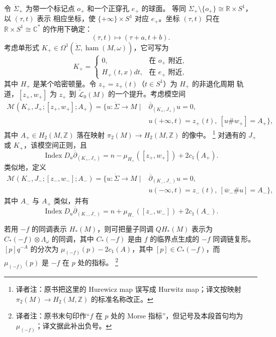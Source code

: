 令 $\dot\Sigma_+$ 为带一个标记点 $o_+$ 和一个正穿孔 $e_+$ 的\personRiemann{}球面。
等同 $\dot\Sigma_+\setminus\{o_+\}\cong\mathbb R\times S^1$，以 $(\tau,t)$ 表示
相应坐标，使 $\{+\infty\}\times S^1$ 对应 $e_+$。坐标 $(\tau,t)$ 只在
$\mathbb R\times S^1\cong\mathbb C^*$ 的作用下确定：
\[
 (\tau,t)\longmapsto(\tau+a,t+b).
\]
考虑单形式 $K_+\in\Omega^1(\dot\Sigma,\operatorname{ham}(M,\omega))$，它可写为
\begin{equation}
 K_+=\begin{cases}
 0,&\text{在 }o_+\text{ 附近},\\
 H_+(t,x)dt,&\text{在 }e_+\text{ 附近},
 \end{cases}
 \label{eq:20-k-plus}
\end{equation}
其中 $H_+$ 是某个哈密顿量。令 $z_+=z_+(t)$（$t\in S^1$）为 $H_+$ 的非退化周期
轨道，$[z_+,w_+]$ 为 $z_+$ 到 $\widetilde{\mathcal L}_0(M)$ 的一个提升。考虑模空间
\[
 \begin{aligned}
 \mathcal M(K_+,J_+;[z_+,w_+];A_+)=\{u:\dot\Sigma\to M\mid{}
 &\overline\partial_{(K_+,J_+)}u=0,\\
 &u(+\infty,t)=z_+(t),\ [u\#w_+]=A_+\},
 \end{aligned}
\]
其中 $A_+\in H_2(M,\mathbb Z)$ 落在\personHurewicz{}映射
$\pi_2(M)\to H_2(M,\mathbb Z)$ 的像中。
\footnote{译者注：原书把这里的 Hurewicz map 误写成 Hurwitz map；译文按映射
$\pi_2(M)\to H_2(M,\mathbb Z)$ 的标准名称改正。}
对通有的 $J_+$ 或 $K_+$，该模空间正则，且
\[
 \operatorname{Index}D_u\overline\partial_{(K_+,J_+)}
 =n-\mu_{H_+}([z_+,w_+])+2c_1(A_+).
\]
类似地，定义
\[
 \begin{aligned}
 \mathcal M(K_-,J_-;[z_-,w_-];A_-)=\{u:\dot\Sigma\to M\mid{}
 &\overline\partial_{(K_-,J_-)}u=0,\\
 &u(-\infty,t)=z_-(t),\ [\overline w_-\#u]=A_-\},
 \end{aligned}
\]
其中 $A_-$ 与 $A_+$ 类似，并有
\[
 \operatorname{Index}D_u\overline\partial_{(K_-,J_-)}
 =n+\mu_{H_-}([z_-,w_-])+2c_1(A_-).
\]

若用 $-f$ 的\personMorse{}同调表示 $H_*(M)$，则可把量子同调 $QH_*(M)$ 表示为
$C_*(-f)\otimes\Lambda_\omega$ 的同调，其中 $C_*(-f)$ 是由 $f$ 的临界点生成的
$-f$ \personMorse{}同调链复形。$[p]q^{-A}$ 的分次为
$\mu_{(-f)}(p)-2c_1(A)$，其中 $[p]\in C_*(-f)$，而 $\mu_{(-f)}(p)$ 是 $-f$ 在
$p$ 处的\personMorse{}指标。
\footnote{译者注：原书末句印作“$f$ 在 $p$ 处的 Morse 指标”，但记号及本段首句均为
$\mu_{(-f)}$；译文据此补出负号。}

